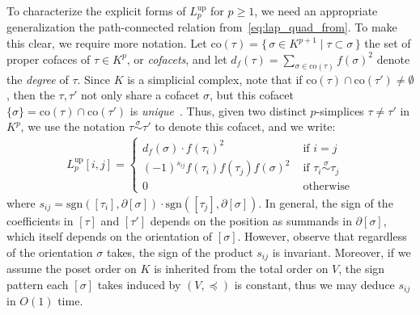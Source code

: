 \documentclass[10pt]{article}
\numberwithin{equation}{section}
\newcommand{\+}{%
	\raisebox{0.18ex}{\scaleobj{0.55}{+}}
}
\theoremstyle{definition}
\begin{document}
To characterize the explicit forms of $L_p^{\mathrm{up}}$ for $p \geq 1$, we need an appropriate generalization the path-connected relation from~\eqref{eq:lap_quad_from}. To make this clear, we require more notation.
Let $\mathrm{co}(\tau) = \{ \, \sigma \in K^{p+1} \mid \tau \subset \sigma \, \}$ the set of proper cofaces of $\tau \in K^p$, or \emph{cofacets}, and let $d_f(\tau) = \sum_{\sigma \in \mathrm{co}(\tau)} f(\sigma)^2$ denote the \emph{degree} of $\tau$.
Since $K$ is a simplicial complex, note that if $\mathrm{co}(\tau) \cap \mathrm{co}(\tau') \neq \emptyset$, then the $\tau, \tau'$ not only share a cofacet $\sigma$, but this cofacet $\{\sigma\} = \mathrm{co}(\tau) \cap \mathrm{co}(\tau')$ is \emph{unique}~\cite{}. Thus, given two distinct $p$-simplices $\tau \neq \tau'$ in $K^p$, we use the notation $\tau \overset{\sigma}{\sim} \tau'$ to denote this cofacet, and we write:
\begin{align}\label{eq:up_laplace_ij}
	 L_p^{\text{up}}[i,j] = \begin{cases}
		 d_f(\sigma) \cdot f(\tau_i)^2 & \text{ if } i = j \\ 
		(-1)^{s_{ij}} f(\tau_i)f(\tau_j)f(\sigma)^2 & \text{ if } \tau_i \overset{\sigma}{\sim} \tau_j \\
		0 & \text{ otherwise} 
	\end{cases}
\end{align}
where $s_{ij} = \mathrm{sgn}([\tau_i], \partial[\sigma]) \cdot \mathrm{sgn}([\tau_j], \partial[\sigma])$.
In general, the sign of the coefficients in $[\tau]$ and $[\tau']$ depends on the position as summands in $\partial[\sigma]$, which itself depends on the orientation of $[\sigma]$. 
However, observe that regardless of the orientation $\sigma$ takes, the sign of the product $s_{ij}$ is invariant. 
Moreover, if we assume the poset order on $K$ is inherited from the total order on $V$, the sign pattern each $[\sigma]$ takes induced by $(V, \preceq)$ is constant, thus we may deduce $s_{ij}$ in $O(1)$ time.
\end{document}

